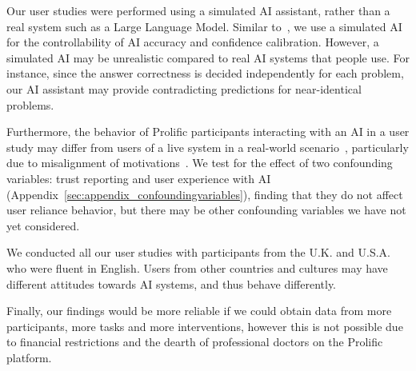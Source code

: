 Our user studies were performed using a simulated AI assistant, rather than a real system such as a Large Language Model. 
Similar to~\citet{buccinca2021trust,dhuliawala2023diachronic}, we use a simulated AI for the controllability of AI accuracy and confidence calibration. 
However, a simulated AI may be unrealistic compared to real AI systems that people use. 
For instance, since the answer correctness is decided independently for each problem, our AI assistant may provide contradicting predictions for near-identical problems. 

Furthermore, the behavior of Prolific participants interacting with an AI in a user study may differ from users of a live system in a real-world scenario~\cite{mcgrath1995methodology}, particularly due to misalignment of motivations~\cite{deci1999meta}. 
We test for the effect of two confounding variables: trust reporting and user experience with AI (Appendix~\ref{sec:appendix_confoundingvariables}), finding that they do not affect user reliance behavior, but there may be other confounding variables we have not yet considered.

We conducted all our user studies with participants from the U.K. and U.S.A. who were fluent in English. 
Users from other countries and cultures may have different attitudes towards AI systems, and thus behave differently.

Finally, our findings would be more reliable if we could obtain data from more participants, more tasks and more interventions, however this is not possible due to financial restrictions and the dearth of professional doctors on the Prolific platform.